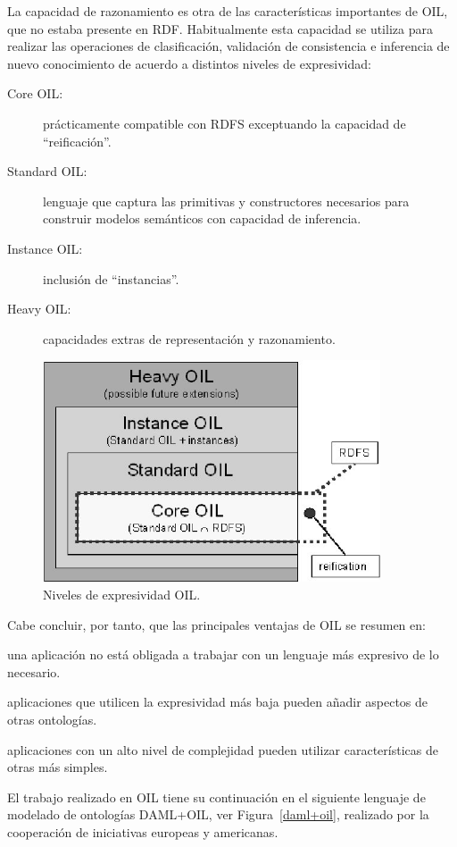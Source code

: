 La capacidad de razonamiento es otra de las características importantes de OIL, que no estaba presente en RDF. Habitualmente esta capacidad se utiliza
para realizar las operaciones de clasificación, validación de consistencia e inferencia de nuevo conocimiento de acuerdo a distintos 
niveles de expresividad: 

\begin{description}
\item[Core OIL:] prácticamente compatible con RDFS exceptuando la capacidad de
``reificación''.
\item[Standard OIL:] lenguaje que captura las primitivas y constructores necesarios para
construir modelos semánticos con capacidad de inferencia.
\item[Instance OIL:] inclusión de ``instancias''.
\item[Heavy OIL:] capacidades extras de representación y razonamiento.
\end{description}


\begin{figure}[htb]
\centering
	\includegraphics[width=10cm]{images/oil}
\caption{Niveles de expresividad OIL.}
\label{fig:oil}
\end{figure}

Cabe concluir, por tanto, que las principales ventajas de OIL se resumen en:
\begin{inparaenum} \item una aplicación no está obligada a trabajar con un
lenguaje más expresivo de lo necesario. \item aplicaciones que utilicen la
expresividad más baja pueden añadir aspectos de otras ontologías.
\item aplicaciones con un alto nivel de complejidad pueden utilizar
características de otras más simples.\end{inparaenum}

El trabajo realizado en OIL tiene su continuación en el siguiente lenguaje de
modelado de ontologías \gls{DAML+OIL}, ver Figura~\ref{daml+oil}, realizado por la cooperación
de iniciativas europeas y americanas.

